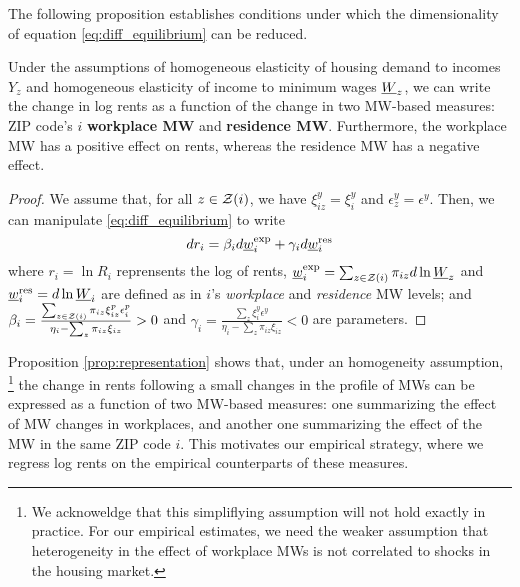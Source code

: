 The following proposition establishes conditions under which the dimensionality
of equation \ref{eq:diff_equilibrium} can be reduced.

\begin{prop}[Representation]\label{prop:representation}
    Under the assumptions of 
    homogeneous elasticity of housing demand to incomes $Y_z$ and
    homogeneous elasticity of income to minimum wages $\underline{W}_z$,
    we can write the change in log rents as a function of the change in two 
    MW-based measures: ZIP code's $i$ \textbf{workplace MW} and 
    \textbf{residence MW}.
    Furthermore, the workplace MW has a positive effect on rents, whereas the
    residence MW has a negative effect.
\end{prop}
\begin{proof}
    We assume that, for all $z\in\mathcal{Z}(i)$, we have 
    $\xi^y_{iz}=\xi^y_{i}$ and 
    $\epsilon_z^y=\epsilon^y$.
    Then, we can manipulate \eqref{eq:diff_equilibrium} to write
    \begin{equation} \label{eq:theory_represenation}
        d r_i = \beta_i  d \underline{w}^{\text{exp}}_i
              + \gamma_i d \underline{w}^{\text{res}}_i
    \end{equation}
    where
    $r_i=\ln R_i$ reprensents the log of rents,
    $\underline{w}^{\text{exp}}_i = \sum_{z\in\mathcal{Z}(i)} \pi_{iz} d \ln \underline{W}_z$ and
    $\underline{w}^{\text{res}}_i = d \ln \underline{W}_i$ are defined as in $i$'s 
    \textit{workplace} and \textit{residence} MW levels; and
    $\beta_i = \frac{\sum_{z\in\mathcal{Z}(i)}\pi_{iz}\xi_{iz}^{p}\epsilon_{i}^{p}}
                    {\eta_{i} - \sum_z \pi_{iz} \xi_{iz}} 
             >0$ and
    $\gamma_i = \frac{\sum_z \xi_{i}^{y}\epsilon^{y}}
                     {\eta_{i} - \sum_z \pi_{iz} \xi_{iz}} 
              < 0$
    are parameters.
\end{proof}

Proposition \ref{prop:representation} shows that, under an homogeneity assumption,%
\footnote{We acknoweldge that this simpliflying assumption will not hold exactly
in practice.
For our empirical estimates, we need the weaker assumption that heterogeneity in 
the effect of workplace MWs is not correlated to shocks in the housing market.}
the change in rents following a small changes in the profile of MWs can be expressed 
as a function of two MW-based measures: 
one summarizing the effect of MW changes in workplaces,
and another one summarizing the effect of the MW in the same ZIP code $i$.
This motivates our empirical strategy, where we regress log rents on the empirical
counterparts of these measures.

